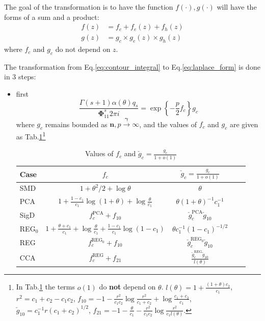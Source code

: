 \documentclass[twoside]{article}
\begin{document}
The goal of the transformation is to have the function $f(\cdot),g(\cdot)$ will have the forms of a sum and a product:
\begin{align*}
    f(z) &=f_c+ f_e(z) + f_h(z)\\
    g(z) &= g_c\times g_e(z) \times g_h(z)
\end{align*}
where $f_c$ and $g_c$ do not depend on $z$.

The transformation from Eq.\ref{eq:contour_integral} to Eq.\ref{eq:laplace_form} is done in 3 steps:
\begin{itemize}
    \item first 
    \begin{equation}
        \frac{\Gamma(s+1)\alpha(\theta)q_s}{\boldsymbol{\Phi}^s_{11}2\pi i} = \exp\left\{ -\frac{p}{2}f_c \right\}g_c
    \end{equation}
    where $g_c$ remains bounded as $\mathbf{n},p\xrightarrow{\boldsymbol{\gamma}}\infty$, and the values of $f_c$ and $g_c$ are given as Tab.\ref{tab:fc_gc_values}\footnote{In Tab.\ref{tab:fc_gc_values} the terms $o(1)$ do \textbf{not} depend on $\theta$. $l(\theta)=1+\frac{(1+\theta)c_2}{c_1}$, $r^2=c_1+c_2-c_1c_2$, $f_{10}=-1-\frac{r^2}{c_1c_2}\log\frac{r^2}{c_1+c_2}+\log\frac{c_1+c_2}{c_1}$, $\check{g}_{10}=c_1^{-1}r(c_1+c_2)^{1/2}$, $f_{21}=-1-\frac{\theta}{c_1}-\frac{r^2}{c_1c_2}\log \frac{r^2}{c_1 l(\theta)}$.}
    \begin{table}[ht]
        \caption{Values of $f_c$ and $\check{g}_c = \frac{g_c}{1+o(1)}$}\label{tab:fc_gc_values}
        \footnotesize
        \begin{center}
          \begin{tabular}{lcccc}
            Case & $f_c$ & $\check{g}_c = \frac{g_c}{1+o(1)}$ \\
            \hline
            SMD & $1+\theta^2/2 + \log\theta $ & $\theta$\\
            PCA & $1+\frac{1-c_1}{c_1}\log(1+\theta)+\log\frac{\theta}{c_1}$ & $\theta(1+\theta)^{-1}c_1^{-1}$ \\
            SigD & $f_c^{\text{PCA}}+f_{10}$ & $\check{g}_c^{\text{PCA}}\check{g}_{10}$ \\
            REG$_0$ & $1+\frac{\theta+c_1}{c_1} + \log\frac{\theta}{c_1} + \frac{1-c_1}{c_1}\log(1-c_1)$ & $\theta c_1^{-1}(1-c_1)^{-1/2}$\\ 
            REG & $f^{\text{REG}_0}_c+f_{10}$ & $\check{g}^{\text{REG}_0}_c\check{g}_{10}$ \\
            CCA & $f_c^{\text{REG}}+f_{21}$ & $\frac{\check{g}_c^{\text{REG}}\check{g}_{10}}{l(\theta)}$
          \end{tabular}
        \end{center}
    \end{table}
    

\end{itemize}
\end{document}
